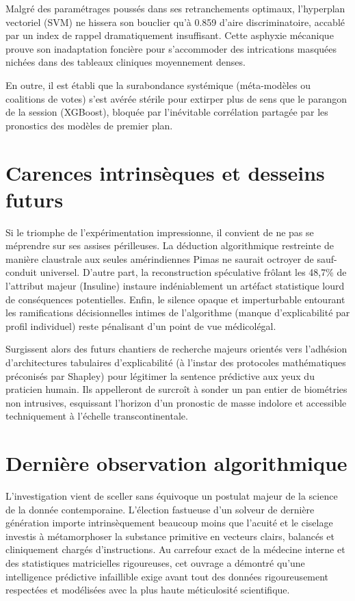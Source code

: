 Malgré des paramétrages poussés dans ses retranchements optimaux, l'hyperplan vectoriel (SVM) ne hissera son bouclier qu'à 0.859 d'aire discriminatoire, accablé par un index de rappel dramatiquement insuffisant. Cette asphyxie mécanique prouve son inadaptation foncière pour s'accommoder des intrications masquées nichées dans des tableaux cliniques moyennement denses.

En outre, il est établi que la surabondance systémique (méta-modèles ou coalitions de votes) s'est avérée stérile pour extirper plus de sens que le parangon de la session (XGBoost), bloquée par l'inévitable corrélation partagée par les pronostics des modèles de premier plan.

\section*{Carences intrinsèques et desseins futurs}

Si le triomphe de l'expérimentation impressionne, il convient de ne pas se méprendre sur ses assises périlleuses. La déduction algorithmique restreinte de manière claustrale aux seules amérindiennes Pimas ne saurait octroyer de sauf-conduit universel. D'autre part, la reconstruction spéculative frôlant les 48,7\% de l'attribut majeur (Insuline) instaure indéniablement un artéfact statistique lourd de conséquences potentielles. Enfin, le silence opaque et imperturbable entourant les ramifications décisionnelles intimes de l'algorithme (manque d'explicabilité par profil individuel) reste pénalisant d'un point de vue médicolégal.

Surgissent alors des futurs chantiers de recherche majeurs orientés vers l'adhésion d'architectures tabulaires d'explicabilité (à l'instar des protocoles mathématiques préconisés par Shapley) pour légitimer la sentence prédictive aux yeux du praticien humain. Ils appelleront de surcroît à sonder un pan entier de biométries non intrusives, esquissant l'horizon d'un pronostic de masse indolore et accessible techniquement à l'échelle transcontinentale.

\section*{Dernière observation algorithmique}

L'investigation vient de sceller sans équivoque un postulat majeur de la science de la donnée contemporaine. L'élection fastueuse d'un solveur de dernière génération importe intrinsèquement beaucoup moins que l'acuité et le ciselage investis à métamorphoser la substance primitive en vecteurs clairs, balancés et cliniquement chargés d'instructions. Au carrefour exact de la médecine interne et des statistiques matricielles rigoureuses, cet ouvrage a démontré qu'une intelligence prédictive infaillible exige avant tout des données rigoureusement respectées et modélisées avec la plus haute méticulosité scientifique.